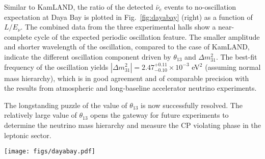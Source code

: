 Similar to KamLAND, the ratio of the detected $\bar\nu_{e}$ events to no-oscillation expectation at Daya Bay is plotted in Fig.~\ref{fig:dayabay} (right) as a function of $L/E_{\nu}$. 
The combined data from the three experimental halls show a near-complete cycle of the expected periodic oscillation feature. 
The smaller amplitude and shorter wavelength of the oscillation, compared to the case of KamLAND, indicate the different oscillation component driven by $\theta_{13}$ and $\Delta{m}^2_{31}$. 
The best-fit frequency of the oscillation yields $|\Delta{m}^2_{31}| = 2.47^{+0.11}_{-0.10} \times 10^{-3}$ eV$^2$ (assuming normal mass hierarchy), which is in good agreement and of comparable precision with the results from atmospheric and long-baseline accelerator neutrino experiments. 

The longstanding puzzle of the value of $\theta_{13}$ is now successfully resolved.
The relatively large value of $\theta_{13}$ opens the gateway for future experiments to determine the neutrino mass hierarchy and measure the CP violating phase in the leptonic sector.

\begin{figure*}[htb] \label{fig:dayabay}
  \centering
  \texttt{[image: figs/dayabay.pdf]}
  \caption{{\bf Daya Bay results}~\cite{Zhang-Neutrino14}: (left) Ratio of the detected to expected $\bar\nu_{e}$ signals at the 8 antineutrino detectors (ADs) located in three experimental halls as a function of effective baseline. The oscillation survival probability at the best-fit value is given by the red curve.
  (right) Ratio of the background-subtracted $\bar\nu_e$ spectrum to the expectation for no-oscillation in the three experimental halls, re-expressed as a function of $L_{\textrm{eff}}/E_{\nu}$. The effective baseline $L_{\textrm{eff}}$ is determined for each experimental hall (EH) to an effective oscillated flux from a single baseline. The oscillation survival probability using the best estimates of $\theta_{13}$ and $|\Delta{m}^2_{31}|$ is given by the red curve.}
\end{figure*}





